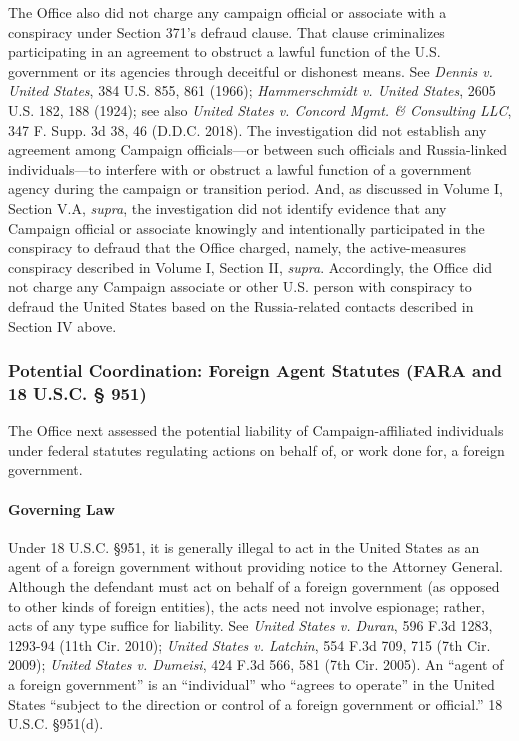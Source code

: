 The Office also did not charge any campaign official or associate with a conspiracy under Section 371's defraud clause.
That clause criminalizes participating in an agreement to obstruct a lawful function of the U.S. government or its agencies through deceitful or dishonest means.
See \textit{Dennis v. United States}, 384 U.S. 855, 861 (1966); \textit{Hammerschmidt v. United States}, 2605 U.S. 182, 188 (1924); see also \textit{United States v. Concord Mgmt. \& Consulting LLC}, 347 F. Supp. 3d 38, 46 (D.D.C. 2018).
The investigation did not establish any agreement among Campaign officials---or between such officials and Russia-linked individuals---to interfere with or obstruct a lawful function of a government agency during the campaign or transition period.
And, as discussed in Volume I, Section V.A, \textit{supra}, the investigation did not identify evidence that any Campaign official or associate knowingly and intentionally participated in the conspiracy to defraud that the Office charged, namely, the active-measures conspiracy described in Volume I, Section II, \textit{supra}.
Accordingly, the Office did not charge any Campaign associate or other U.S. person with conspiracy to defraud the United States based on the Russia-related contacts described in Section IV above.

\subsubsection{Potential Coordination: Foreign Agent Statutes (FARA and 18 U.S.C. § 951)}
The Office next assessed the potential liability of Campaign-affiliated individuals under federal statutes regulating actions on behalf of, or work done for, a foreign government.

\paragraph{Governing Law}
Under 18 U.S.C. \S 951, it is generally illegal to act in the United States as an agent of a foreign government without providing notice to the Attorney General.
Although the defendant must act on behalf of a foreign government (as opposed to other kinds of foreign entities), the acts need not involve espionage; rather, acts of any type suffice for liability.
See \textit{United States v. Duran}, 596 F.3d 1283, 1293-94 (11th Cir. 2010); \textit{United States v. Latchin}, 554 F.3d 709, 715 (7th Cir. 2009); \textit{United States v. Dumeisi}, 424 F.3d 566, 581 (7th Cir. 2005).
An ``agent of a foreign government'' is an ``individual'' who ``agrees to operate'' in the United States ``subject to the direction or control of a foreign government or official.'' 18 U.S.C. \S 951(d).

